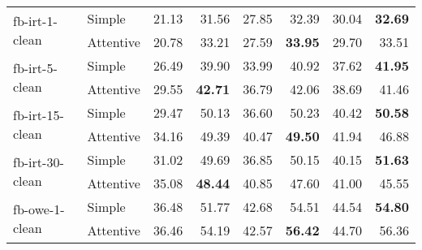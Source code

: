 \begin{tabular}{| l | l | r | r | r | r | r | r |}
    \multirow{2}{*}{fb-irt-1-clean}
    & Simple    & 21.13 & 31.56 & 27.85 & 32.39 & 30.04 & \textbf{32.69} \\
    & Attentive & 20.78 & 33.21 & 27.59 & \textbf{33.95} & 29.70 & 33.51 \\ \hline

    \multirow{2}{*}{fb-irt-5-clean}
    & Simple    & 26.49 & 39.90 & 33.99 & 40.92 & 37.62 & \textbf{41.95} \\
    & Attentive & 29.55 & \textbf{42.71} & 36.79 & 42.06 & 38.69 & 41.46 \\ \hline

    \multirow{2}{*}{fb-irt-15-clean}
    & Simple    & 29.47 & 50.13 & 36.60 & 50.23 & 40.42 & \textbf{50.58} \\
    & Attentive & 34.16 & 49.39 & 40.47 & \textbf{49.50} & 41.94 & 46.88 \\ \hline

    \multirow{2}{*}{fb-irt-30-clean}
    & Simple    & 31.02 & 49.69 & 36.85 & 50.15 & 40.15 & \textbf{51.63} \\
    & Attentive & 35.08 & \textbf{48.44} & 40.85 & 47.60 & 41.00 & 45.55 \\ \hline

    \multirow{2}{*}{fb-owe-1-clean}
    & Simple    & 36.48 & 51.77 & 42.68 & 54.51 & 44.54 & \textbf{54.80} \\
    & Attentive & 36.46 & 54.19 & 42.57 & \textbf{56.42} & 44.70 & 56.36 \\ \hline

\end{tabular}
